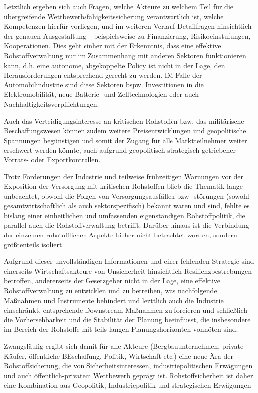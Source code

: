 \documentclass[12pt,a4paper,oneside]{book} %
\begin{document}
Letztlich ergeben sich auch Fragen, welche Akteure zu welchem Teil für die übergreifende Wettbewerbsfähigkeitssicherung verantwortlich ist, welche Kompetenzen hierfür vorliegen, und im weiteren Verlauf Detailfragen hinsichtlich der genauen Ausgestaltung -- beispielsweise zu Finanzierung, Risikoeinstufungen, Kooperationen. Dies geht einher mit der Erkenntnis, dass eine effektive Rohstoffverwaltung nur im Zusammenhang mit anderen Sektoren funktionieren kann, d.h. eine autonome, abgekoppelte Policy ist nicht in der Lage, den Herausforderungen entsprechend gerecht zu werden. IM Falle der Automobilindustrie sind diese Sektoren bspw. Investitionen in die Elektromobilität, neue Batterie- und Zelltechnologien oder auch Nachhaltigkeitsverpflichtungen.

Auch das Verteidigungsinteresse an kritischen Rohstoffen bzw. das militärische Beschaffungswesen können zudem weitere Preisentwicklungen und geopolitische Spannungen begünstigen und somit der Zugang für alle Marktteilnehmer weiter erschwert werden könnte, auch aufgrund geopolitisch-strategisch getriebener Vorrats- oder Exportkontrollen.

Trotz Forderungen der Industrie und teilweise frühzeitigen Warnungen vor der Exposition der Versorgung mit kritischen Rohstoffen blieb die Thematik lange unbeachtet, obwohl die Folgen von Versorgungsausfällen bzw -störungen (sowohl gesamtwirtschaftlich als auch sektorspezifisch) bekannt waren und sind, fehlte es bislang einer einheitlichen und umfassenden eigenständigen Rohstoffpolitik, die parallel auch die Rohstoffverwaltung betrifft. Darüber hinaus ist die Verbindung der einzelnen rohstofflichen Aspekte bisher nicht betrachtet worden, sondern größtenteils isoliert.

Aufgrund dieser unvollständigen Informationen und einer fehlenden Strategie sind einerseits Wirtschaftsakteure von Unsicherheit hinsichtlich Resilienzbestrebungen betroffen, andererseits der Gesetzgeber nicht in der Lage, eine effektive Rohstoffverwaltung zu entwicklen und zu betreiben, was nachfolgende Maßnahmen und Instrumente behindert und lezttlich auch die Industrie einschränkt, entsprchende Downstream-Maßnahmen zu forcieren und schließlich die Vorhersehbarkeit und die Stabilität der Planung beeinflusst, die insbesondere im Bereich der Rohstoffe mit teils langen Planungshorizonten vonnöten sind.

Zwangsläufig ergibt sich damit für alle Akteure (Bergbauunternehmen, private Käufer, öffentliche BEschaffung, Politik, Wirtschaft etc.) eine neue Ära der Rohstoffsicherung, die von Sicherheitsinteressen, industriepolitischen Erwägungen und auch öffentlich-privatem Wettbewerb geprägt ist. Rohstoffsicherheit ist daher eine Kombination aus Geopolitik, Industriepolitik und strategischen Erwägungen
\end{document}
